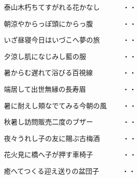\vspace{0.6cm}
\begin{shiika}泰山木朽ちてすがれる花かなし　　　
\hfill{・・}\end{shiika}
\vspace{0.6cm}
\begin{shiika}朝涼やからっぽ頭にからっ腹　　　　
\hfill{・・}\end{shiika}
\vspace{0.6cm}
\begin{shiika}いざ昼寝今日はいづこへ夢の旅　　　
\hfill{・・}\end{shiika}
\vspace{0.6cm}
\begin{shiika}夕涼し肌になじみし藍の服　　　　　
\hfill{・・}\end{shiika}
\vspace{0.6cm}
\begin{shiika}暑からむ遅れて浴びる百視線　　　　
\hfill{・・}\end{shiika}
\vspace{0.6cm}
\begin{shiika}端居して出世無縁の長寿眉　　　　　
\hfill{・・}\end{shiika}
\vspace{0.6cm}
\begin{shiika}暑に耐えし頬なでてみる今朝の風　　
\hfill{・・}\end{shiika}
\vspace{0.6cm}
\begin{shiika}秋暑し訪問販売二度のブザー　　　　
\hfill{・・}\end{shiika}
\vspace{0.6cm}
\begin{shiika}夜々うれし子の友に賜ぶ古梅酒　　　
\hfill{・・}\end{shiika}
\vspace{0.6cm}
\begin{shiika}花火見に橋へ子が押す車椅子　　　　
\hfill{・・}\end{shiika}
\vspace{0.6cm}
\begin{shiika}癒へてつくる迎え送りの盆団子　　　
\hfill{・・}\end{shiika}
